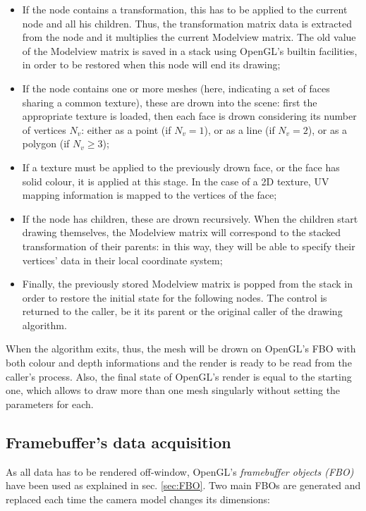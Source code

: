 \begin{itemize}
  \item{If the node contains a transformation, this has to be applied to the
      current node and all his children. Thus, the transformation matrix data is
      extracted from the node and it multiplies the current Modelview matrix.
      The old value of the Modelview matrix is saved in a stack using OpenGL's
      builtin facilities, in order to be restored when this node will end its
    drawing;}
  \item{If the node contains one or more meshes (here, indicating a set of
      faces sharing a common texture), these are drown into the scene: first the
      appropriate texture is loaded, then each face is drown considering its
      number of vertices $N_v$: either as a point (if $N_v=1$), or as a line (if
    $N_v=2$), or as a polygon (if $N_v \geq 3$);}
  \item{If a texture must be applied to the previously drown face, or the face
      has solid colour, it is applied at this stage. In the case of a 2D
    texture, UV mapping information is mapped to the vertices of the face;}
  \item{If the node has children, these are drown recursively. When the children
      start drawing themselves, the Modelview matrix will correspond to the
      stacked transformation of their parents: in this way, they will be able to
    specify their vertices' data in their local coordinate system;}
  \item{Finally, the previously stored Modelview matrix is popped from the stack
      in order to restore the initial state for the following nodes. The
      control is returned to the caller, be it its parent or the
    original caller of the drawing algorithm.}
\end{itemize}

When the algorithm exits, thus, the mesh will be drown on OpenGL's FBO %
with both colour and depth informations and the render is ready to be read from the
caller's process. Also, the final state of OpenGL's render is equal to the
starting one, which allows to draw more than one mesh singularly without
setting the parameters for each.

\subsection{Framebuffer's data acquisition}
As all data has to be rendered off-window, OpenGL's \emph{framebuffer objects
(\emph{FBO})} have been used as explained in sec. \ref{sec:FBO}. Two main FBOs
are generated and replaced each time the camera model changes its dimensions:

